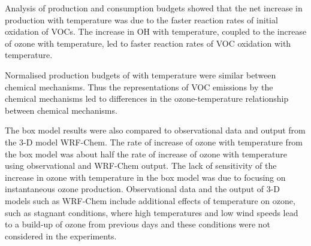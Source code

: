 Analysis of  production and consumption budgets showed that the net increase in  production with temperature was due to the faster reaction rates of initial oxidation of VOCs.
The increase in OH with temperature, coupled to the increase of ozone with temperature, led to faster reaction rates of VOC oxidation with temperature.

Normalised production budgets of  with temperature were similar between chemical mechanisms.
Thus the representations of VOC emissions by the chemical mechanisms led to differences in the ozone-temperature relationship between chemical mechanisms.

The box model results were also compared to observational data and output from the 3-D model WRF-Chem.
The rate of increase of ozone with temperature from the box model was about half the rate of increase of ozone with temperature using observational and WRF-Chem output.
The lack of sensitivity of the increase in ozone with temperature in the box model was due to focusing on instantaneous ozone production.
Observational data and the output of 3-D models such as WRF-Chem include additional effects of temperature on ozone, such as stagnant conditions, where high temperatures and low wind speeds lead to a build-up of ozone from previous days and these conditions were not considered in the experiments.
